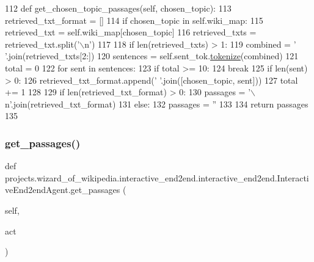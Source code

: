 \begin{DoxyCode}
112     \textcolor{keyword}{def }get\_chosen\_topic\_passages(self, chosen\_topic):
113         retrieved\_txt\_format = []
114         \textcolor{keywordflow}{if} chosen\_topic \textcolor{keywordflow}{in} self.wiki\_map:
115             retrieved\_txt = self.wiki\_map[chosen\_topic]
116             retrieved\_txts = retrieved\_txt.split(\textcolor{stringliteral}{'\(\backslash\)n'})
117 
118             \textcolor{keywordflow}{if} len(retrieved\_txts) > 1:
119                 combined = \textcolor{stringliteral}{' '}.join(retrieved\_txts[2:])
120                 sentences = self.sent\_tok.\hyperlink{namespaceparlai_1_1agents_1_1tfidf__retriever_1_1build__tfidf_a1fdb457e98eb4e4c26047e229686a616}{tokenize}(combined)
121                 total = 0
122                 \textcolor{keywordflow}{for} sent \textcolor{keywordflow}{in} sentences:
123                     \textcolor{keywordflow}{if} total >= 10:
124                         \textcolor{keywordflow}{break}
125                     \textcolor{keywordflow}{if} len(sent) > 0:
126                         retrieved\_txt\_format.append(\textcolor{stringliteral}{' '}.join([chosen\_topic, sent]))
127                         total += 1
128 
129         \textcolor{keywordflow}{if} len(retrieved\_txt\_format) > 0:
130             passages = \textcolor{stringliteral}{'\(\backslash\)n'}.join(retrieved\_txt\_format)
131         \textcolor{keywordflow}{else}:
132             passages = \textcolor{stringliteral}{''}
133 
134         \textcolor{keywordflow}{return} passages
135 
\end{DoxyCode}
\mbox{\label{classprojects_1_1wizard__of__wikipedia_1_1interactive__end2end_1_1interactive__end2end_1_1InteractiveEnd2endAgent_a9797c60694b89a67f22b5ad30f9a40e8}} 
\subsubsection{\texorpdfstring{get\+\_\+passages()}{get\_passages()}}
{\footnotesize\ttfamily def projects.\+wizard\+\_\+of\+\_\+wikipedia.\+interactive\+\_\+end2end.\+interactive\+\_\+end2end.\+Interactive\+End2end\+Agent.\+get\+\_\+passages (\begin{DoxyParamCaption}\item[{}]{self,  }\item[{}]{act }\end{DoxyParamCaption})}


